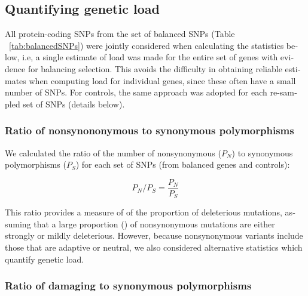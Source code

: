 \begin{refsection}
\begin{otherlanguage}{english}
\afterpage{\FloatBarrier}
\subsection{Quantifying genetic load} 
All protein-coding SNPs from the set of balanced SNPs (Table ~\ref{tab:balancedSNPs}) were jointly considered when calculating the statistics below, i.e, a single estimate of load was made for the entire set of genes with evidence for balancing selection. This avoids the difficulty in obtaining reliable estimates when computing load for individual genes, since these often have a small number of SNPs. For controls, the same approach was adopted for each re-sampled set of SNPs (details below). 

\subsubsection{Ratio of nonsynononymous to synonymous polymorphisms}

We calculated the ratio of the number of nonsynonymous ($P_{N}$) to synonymous polymorphisms ($P_{S}$) for each set of SNPs (from balanced genes and controls):

\begin{equation}
P_{N}/P_{S}=\frac{P_{N}}{P_{S}}
\end{equation} 

This ratio provides a  measure of of the proportion of  deleterious mutations, assuming that a large proportion (\cite{Eyre-Walker1999,Subramanian2012}) of nonsynonymous mutations are either strongly or mildly deleterious. However, because nonsynonymous variants include those that are adaptive or neutral, we also considered alternative statistics which quantify genetic load.

\subsubsection{Ratio of damaging to synonymous polymorphisms}


\end{otherlanguage}
\end{refsection}
